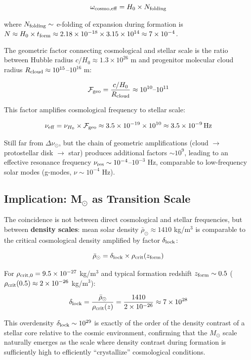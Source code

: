 \documentclass[11pt,a4paper]{article}
\begin{document}
\[\omega_{\rm cosmo,eff} = H_0 \times N_{\rm folding}\]

where \(N_{\rm folding} \sim\) e-folding of expansion during formation
is
\(N \approx H_0 \times t_{\rm form} \approx 2.18\times10^{-18} \times 3.15\times10^{14} \approx 7\times10^{-4}\).

The geometric factor connecting cosmological and stellar scale is the
ratio between Hubble radius \(c/H_0 \approx 1.3\times10^{26}\) m and
progenitor molecular cloud radius
\(R_{\rm cloud} \approx 10^{15}\)--\(10^{16}\) m:

\[\mathcal{F}_{\rm geo} = \frac{c/H_0}{R_{\rm cloud}} \approx 10^{10}\text{--}10^{11}\]

This factor amplifies cosmological frequency to stellar scale:

\[\nu_{\rm eff} = \nu_{H_0} \times \mathcal{F}_{\rm geo} \approx 3.5\times10^{-19} \times 10^{10} \approx 3.5\times10^{-9}\,\mathrm{Hz}\]

Still far from \(\Delta\nu_\odot\), but the chain of geometric
amplifications (cloud $\rightarrow$ protostellar disk $\rightarrow$ star) produces additional
factors \(\sim 10^9\), leading to an effective resonance frequency
\(\nu_{\rm res} \sim 10^{-4}\)--\(10^{-3}\) Hz, comparable to
low-frequency solar modes (g-modes, \(\nu \sim 10^{-4}\) Hz).

\hypertarget{b.3-implication-m-as-transition-scale}{%
\subsection*{Implication: M$_{\odot}$ as Transition
Scale}\label{b.3-implication-m-as-transition-scale}}

The coincidence is not between direct cosmological and stellar
frequencies, but between \textbf{density scales}: mean solar density
\(\bar\rho_\odot \approx 1410\) kg/m$^{3}$ is comparable to the critical
cosmological density amplified by factor \(\delta_{\rm lock}\):

\[\bar\rho_\odot = \delta_{\rm lock} \times \rho_{\rm crit}(z_{\rm form})\]

For \(\rho_{\rm crit,0} = 9.5\times10^{-27}\) kg/m$^{3}$ and typical
formation redshift \(z_{\rm form} \sim 0.5\)
(\(\rho_{\rm crit}(0.5) \approx 2\times10^{-26}\) kg/m$^{3}$):

\[\delta_{\rm lock} = \frac{\bar\rho_\odot}{\rho_{\rm crit}(z)} = \frac{1410}{2\times10^{-26}} \approx 7\times10^{28}\]

This overdensity \(\delta_{\rm lock} \sim 10^{29}\) is exactly of the
order of the density contrast of a stellar core relative to the cosmic
environment, confirming that the \(M_\odot\) scale naturally emerges as
the scale where density contrast during formation is sufficiently high
to efficiently ``crystallize'' cosmological conditions.
\end{document}
